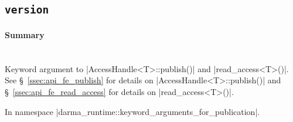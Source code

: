 \subsection{\texttt{version}}
\label{ssec:api_fe_version}

\paragraph{Summary}\mbox{}\\ 
Keyword argument to |AccessHandle<T>::publish()| and
|read_access<T>()|.  See \S~\ref{ssec:api_fe_publish} for details on
|AccessHandle<T>::publish()| and \S~\ref{ssec:api_fe_read_access} for
details on |read_access<T>()|.

In namespace |darma_runtime::keyword_arguments_for_publication|.

%
%
%
%



